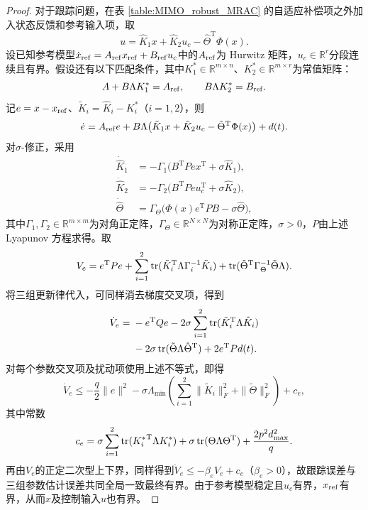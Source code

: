 \begin{proof}
    对于跟踪问题，在表 \ref{table:MIMO_robust_MRAC} 的自适应补偿项之外加入状态反馈和参考输入项，取
    \[
        u=\hat K_1x+\hat K_2u_c-\hat\Theta^{\mathrm{T}}\Phi(x).
    \]
    设已知参考模型$\dot x_{\operatorname{ref}}=A_{\operatorname{ref}}x_{\operatorname{ref}}+B_{\operatorname{ref}}u_c$中的$A_{\operatorname{ref}}$为 Hurwitz 矩阵，$u_c\in\mathbb{R}^r$分段连续且有界。假设还有以下匹配条件，其中$K_1^*\in\mathbb{R}^{m\times n}$、$K_2^*\in\mathbb{R}^{m\times r}$为常值矩阵：
    \[
        A+B\Lambda K_1^*=A_{\operatorname{ref}},\qquad B\Lambda K_2^*=B_{\operatorname{ref}}.
    \]
    记$e=x-x_{\operatorname{ref}}$、$\tilde K_i=\hat K_i-K_i^*$（$i=1,2$），则
    \[
        \dot e=A_{\operatorname{ref}}e+B\Lambda\bigl(\tilde K_1x+\tilde K_2u_c-\tilde\Theta^{\mathrm{T}}\Phi(x)\bigr)+d(t).
    \]
    对$\sigma$-修正，采用
    \begin{align*}
        \dot{\hat K}_1&=-\Gamma_1\bigl(B^{\mathrm{T}}Pex^{\mathrm{T}}+\sigma\hat K_1\bigr),\\
        \dot{\hat K}_2&=-\Gamma_2\bigl(B^{\mathrm{T}}Peu_c^{\mathrm{T}}+\sigma\hat K_2\bigr),\\
        \dot{\hat\Theta}&=\Gamma_\Theta\bigl(\Phi(x)e^{\mathrm{T}}PB-\sigma\hat\Theta\bigr),
    \end{align*}
    其中$\Gamma_1,\Gamma_2\in\mathbb{R}^{m\times m}$为对角正定阵，$\Gamma_\Theta\in\mathbb{R}^{N\times N}$为对称正定阵，$\sigma>0$，$P$由上述 Lyapunov 方程求得。取
    \[
        V_e=e^{\mathrm{T}}Pe+\sum_{i=1}^2\operatorname{tr}(\tilde K_i^{\mathrm{T}}\Lambda\Gamma_i^{-1}\tilde K_i)
        +\operatorname{tr}(\tilde\Theta^{\mathrm{T}}\Gamma_\Theta^{-1}\tilde\Theta\Lambda).
    \]
    将三组更新律代入，可同样消去梯度交叉项，得到
    \[
    \begin{aligned}
        \dot V_e={}&-e^{\mathrm{T}}Qe-2\sigma\sum_{i=1}^2\operatorname{tr}(\tilde K_i^{\mathrm{T}}\Lambda\hat K_i)\\
        &-2\sigma\operatorname{tr}(\tilde\Theta\Lambda\hat\Theta^{\mathrm{T}})+2e^{\mathrm{T}}Pd(t).
    \end{aligned}
    \]
    对每个参数交叉项及扰动项使用上述不等式，即得
    \[
        \dot V_e\le-\frac q2\|e\|^2
        -\sigma\Lambda_{\mathrm{min}}\left(\sum_{i=1}^2\|\tilde K_i\|_F^2+\|\tilde\Theta\|_F^2\right)+c_e,
    \]
    其中常数
    \[
        c_e=\sigma\sum_{i=1}^2\operatorname{tr}({K_i^*}^{\mathrm{T}}\Lambda K_i^*)
        +\sigma\operatorname{tr}(\Theta\Lambda\Theta^{\mathrm{T}})+\frac{2p^2d_{\max}^2}{q}.
    \]
    再由$V_e$的正定二次型上下界，同样得到$\dot V_e\le-\beta_eV_e+c_e$（$\beta_e>0$），故跟踪误差与三组参数估计误差共同全局一致最终有界。由于参考模型稳定且$u_c$有界，$x_{\operatorname{ref}}$有界，从而$x$及控制输入$u$也有界。
\end{proof}


